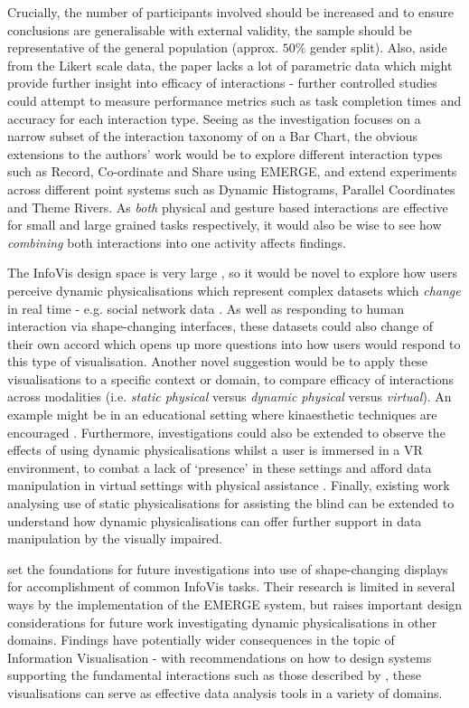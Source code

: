 \documentclass[11pt]{article}
\begin{document}
Crucially, the number of participants involved should be increased and to ensure conclusions are generalisable with external validity, the sample should be representative of the general population (approx. $50\%$ gender split). Also, aside from the Likert scale data, the paper lacks a lot of parametric data which might provide further insight into efficacy of interactions - further controlled studies could attempt to measure performance metrics such as task completion times and accuracy for each interaction type. Seeing as the investigation focuses on a narrow subset of the interaction taxonomy of \citet{heer2012} on a Bar Chart, the obvious extensions to the authors' work would be to explore different interaction types such as Record, Co-ordinate and Share using EMERGE, and extend experiments across different point systems such as Dynamic Histograms, Parallel Coordinates and Theme Rivers. As \textit{both} physical and gesture based interactions are effective for small and large grained tasks respectively, it would also be wise to see how \textit{combining} both interactions into one activity affects findings.

The InfoVis design space is very large \citep{card1997}, so it would be novel to explore how users perceive dynamic physicalisations which represent complex datasets which \textit{change} in real time - e.g. social network data \citep{federico2011}. As well as responding to human interaction via shape-changing interfaces, these datasets could also change of their own accord which opens up more questions into how users would respond to this type of visualisation. Another novel suggestion would be to apply these visualisations to a specific context or domain, to compare efficacy of interactions across modalities (i.e. \textit{static physical} versus \textit{dynamic physical} versus \textit{virtual}). An example might be in an educational setting where kinaesthetic techniques are encouraged \citep{gilakjani2011}. Furthermore, investigations could also be extended to observe the effects of using dynamic physicalisations whilst a user is immersed in a VR environment, to combat a lack of `presence' in these settings and afford data manipulation in virtual settings with physical assistance \citep{tennent2017}. Finally, existing work analysing use of static physicalisations for assisting the blind \citep{perkins2002} can be extended to understand how dynamic physicalisations can offer further support in data manipulation by the visually impaired.

\citet{taher2015} set the foundations for future investigations into use of shape-changing displays for accomplishment of common InfoVis tasks. Their research is limited in several ways by the implementation of the EMERGE system, but raises important design considerations for future work investigating dynamic physicalisations in other domains. Findings have potentially wider consequences in the topic of Information Visualisation - with recommendations on how to design systems supporting the fundamental interactions such as those described by \citet{heer2012}, these visualisations can serve as effective data analysis tools in a variety of domains.


\newpage
\small

\normalsize
\end{document}
